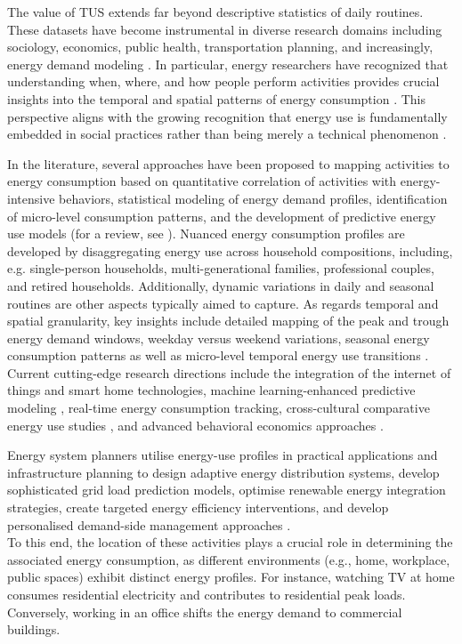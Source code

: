 \documentclass[a4paper]{article}
\begin{document}
The value of TUS extends far beyond descriptive statistics of daily routines. These datasets have become instrumental in diverse research domains including sociology, economics, public health, transportation planning, and increasingly, energy demand modeling \parencite{lopianoEnergyDemandIts2022}. In particular, energy researchers have recognized that understanding when, where, and how people perform activities provides crucial insights into the temporal and spatial patterns of energy consumption \parencite{shove2009time}. This perspective aligns with the growing recognition that energy use is fundamentally embedded in social practices rather than being merely a technical phenomenon \parencite{shoveWhatEnergySocial2014,torritiUnderstandingTimingEnergy2017}.

In the literature, several approaches have been proposed to mapping activities to energy consumption based on quantitative correlation of activities with energy-intensive behaviors, statistical modeling of energy demand profiles, identification of micro-level consumption patterns, and the development of predictive energy use models (for a review, see \textcite{torritiReviewTimeUse2014}). Nuanced energy consumption profiles are developed by disaggregating energy use across household compositions, including, e.g. single-person households, multi-generational families, professional couples, and retired households. Additionally, dynamic variations in daily and seasonal routines are other aspects typically aimed to capture. As regards temporal and spatial granularity, key insights include detailed mapping of the peak and trough energy demand windows, weekday versus weekend variations, seasonal energy consumption patterns as well as micro-level temporal energy use transitions \parencite{torritiUnderstandingTimingEnergy2017}. Current cutting-edge research directions \parencite{lopianoEnergyDemandIts2022} include the integration of the internet of things and smart home technologies, machine learning-enhanced predictive modeling \parencite{araoInferringHomeOutofhome2025}, real-time energy consumption tracking, cross-cultural comparative energy use studies \parencite{davidovCrossCulturalAnalysisMethods2018}, and advanced behavioral economics approaches \parencite{barthelmesProfilingOccupantBehaviour2018}.

Energy system planners utilise energy-use profiles in practical applications and infrastructure planning to design adaptive energy distribution systems, develop sophisticated grid load prediction models, optimise renewable energy integration strategies, create targeted energy efficiency interventions, and develop personalised demand-side management approaches \parencite{pickeringDistrictEnergySystem2019,mikkolaModelsGeneratingPlace2014,wagnerModelingHouseholdElectricity2016}.  \\
To this end, the location of these activities plays a crucial role in determining the associated energy consumption, as different environments (e.g., home, workplace, public spaces) exhibit distinct energy profiles. For instance, watching TV at home consumes residential electricity and contributes to residential peak loads. Conversely, working in an office shifts the energy demand to commercial buildings.
\end{document}
